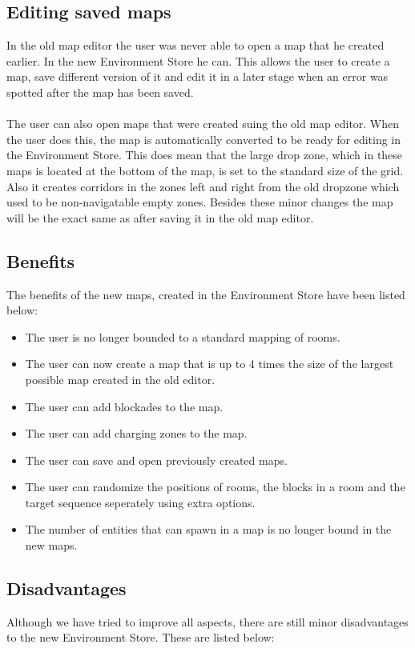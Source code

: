 \subsection{Editing saved maps}
In the old map editor the user was never able to open a map that he created earlier. In the new Environment Store he can.
This allows the user to create a map, save different version of it and edit it in a later stage when an error was spotted after the map has been saved.
\\
\\
The user can also open maps that were created suing the old map editor. When the user does this, the map is automatically converted to be ready
for editing in the Environment Store. This does mean that the large drop zone, which in these maps is located at the bottom of the map, is set
to the standard size of the grid. Also it creates corridors in the zones left and right from the old dropzone which used to be non-navigatable empty zones.
Besides these minor changes the map will be the exact same as after saving it in the old map editor.

\subsection{Benefits}
The benefits of the new maps, created in the Environment Store have been listed below:

\begin{itemize}
	\item The user is no longer bounded to a standard mapping of rooms.
	\item The user can now create a map that is up to 4 times the size of the largest possible map created in the old editor.
	\item The user can add blockades to the map.
	\item The user can add charging zones to the map.
	\item The user can save and open previously created maps.
	\item The user can randomize the positions of rooms, the blocks in a room and the target sequence seperately using extra options.
	\item The number of entities that can spawn in a map is no longer bound in the new maps.
\end{itemize}


\subsection{Disadvantages}
Although we have tried to improve all aspects, there are still minor disadvantages to the new Environment Store. These are listed below:

